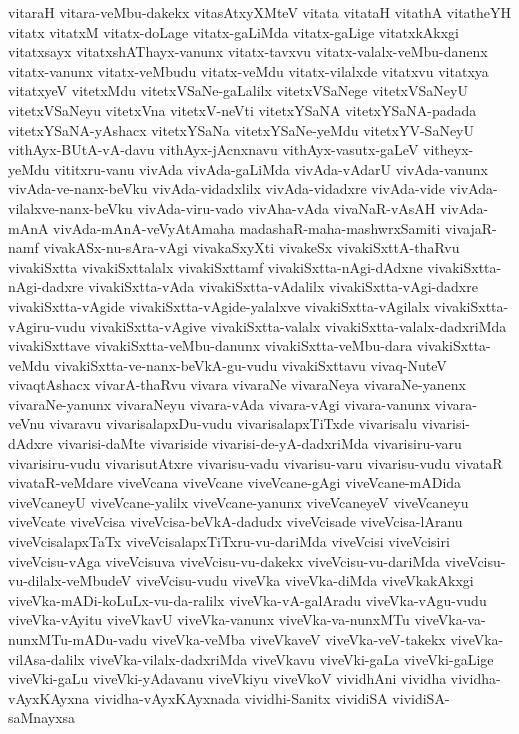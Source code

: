 {vitaraH
vitara-veMbu-dakekx
vitasAtxyXMteV
vitata
vitataH
vitathA
vitatheYH
vitatx
vitatxM
vitatx-doLage
vitatx-gaLiMda
vitatx-gaLige
vitatxkAkxgi
vitatxsayx
vitatxshAThayx-vanunx
vitatx-tavxvu
vitatx-valalx-veMbu-danenx
vitatx-vanunx
vitatx-veMbudu
vitatx-veMdu
vitatx-vilalxde
vitatxvu
vitatxya
vitatxyeV
vitetxMdu
vitetxVSaNe-gaLalilx
vitetxVSaNege
vitetxVSaNeyU
vitetxVSaNeyu
vitetxVna
vitetxV-neVti
vitetxYSaNA
vitetxYSaNA-padada
vitetxYSaNA-yAshacx
vitetxYSaNa
vitetxYSaNe-yeMdu
vitetxYV-SaNeyU
vithAyx-BUtA-vA-davu
vithAyx-jAcnxnavu
vithAyx-vasutx-gaLeV
vitheyx-yeMdu
vititxru-vanu
vivAda
vivAda-gaLiMda
vivAda-vAdarU
vivAda-vanunx
vivAda-ve-nanx-beVku
vivAda-vidadxlilx
vivAda-vidadxre
vivAda-vide
vivAda-vilalxve-nanx-beVku
vivAda-viru-vado
vivAha-vAda
vivaNaR-vAsAH
vivAda-mAnA
vivAda-mAnA-veVyAtAmaha madashaR-maha-mashwrxSamiti
vivajaR-namf
vivakASx-nu-sAra-vAgi
vivakaSxyXti
vivakeSx
vivakiSxttA-thaRvu
vivakiSxtta
vivakiSxttalalx
vivakiSxttamf
vivakiSxtta-nAgi-dAdxne
vivakiSxtta-nAgi-dadxre
vivakiSxtta-vAda
vivakiSxtta-vAdalilx
vivakiSxtta-vAgi-dadxre
vivakiSxtta-vAgide
vivakiSxtta-vAgide-yalalxve
vivakiSxtta-vAgilalx
vivakiSxtta-vAgiru-vudu
vivakiSxtta-vAgive
vivakiSxtta-valalx
vivakiSxtta-valalx-dadxriMda
vivakiSxttave
vivakiSxtta-veMbu-danunx
vivakiSxtta-veMbu-dara
vivakiSxtta-veMdu
vivakiSxtta-ve-nanx-beVkA-gu-vudu
vivakiSxttavu
vivaq-NuteV
vivaqtAshacx
vivarA-thaRvu
vivara
vivaraNe
vivaraNeya
vivaraNe-yanenx
vivaraNe-yanunx
vivaraNeyu
vivara-vAda
vivara-vAgi
vivara-vanunx
vivara-veVnu
vivaravu
vivarisalapxDu-vudu
vivarisalapxTiTxde
vivarisalu
vivarisi-dAdxre
vivarisi-daMte
vivariside
vivarisi-de-yA-dadxriMda
vivarisiru-varu
vivarisiru-vudu
vivarisutAtxre
vivarisu-vadu
vivarisu-varu
vivarisu-vudu
vivataR
vivataR-veMdare
viveVcana
viveVcane
viveVcane-gAgi
viveVcane-mADida
viveVcaneyU
viveVcane-yalilx
viveVcane-yanunx
viveVcaneyeV
viveVcaneyu
viveVcate
viveVcisa
viveVcisa-beVkA-dadudx
viveVcisade
viveVcisa-lAranu
viveVcisalapxTaTx
viveVcisalapxTiTxru-vu-dariMda
viveVcisi
viveVcisiri
viveVcisu-vAga
viveVcisuva
viveVcisu-vu-dakekx
viveVcisu-vu-dariMda
viveVcisu-vu-dilalx-veMbudeV
viveVcisu-vudu
viveVka
viveVka-diMda
viveVkakAkxgi
viveVka-mADi-koLuLx-vu-da-ralilx
viveVka-vA-galAradu
viveVka-vAgu-vudu
viveVka-vAyitu
viveVkavU
viveVka-vanunx
viveVka-va-nunxMTu
viveVka-va-nunxMTu-mADu-vadu
viveVka-veMba
viveVkaveV
viveVka-veV-takekx
viveVka-vilAsa-dalilx
viveVka-vilalx-dadxriMda
viveVkavu
viveVki-gaLa
viveVki-gaLige
viveVki-gaLu
viveVki-yAdavanu
viveVkiyu
viveVkoV
vividhAni
vividha
vividha-vAyxKAyxna
vividha-vAyxKAyxnada
vividhi-Sanitx
vividiSA
vividiSA-saMnayxsa
}
